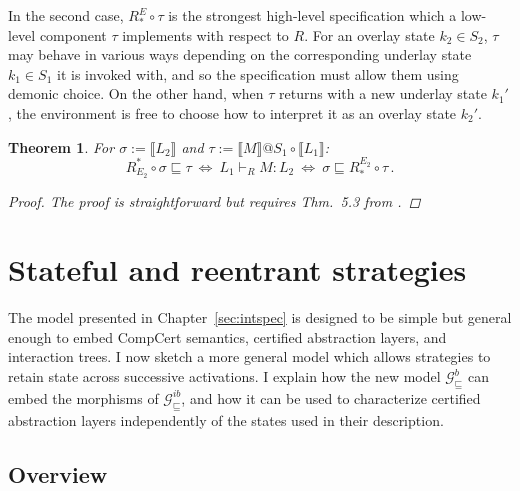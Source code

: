 \documentclass[11pt,oneside]{book}
\newtheorem{theorem}{Theorem}[chapter]
\newtheorem{lemma}[theorem]{Lemma}
\theoremstyle{definition}
\newcommand{\gcat}{\mathcal{G}_{\sqsubseteq}}
\begin{document}
In the second case,
$R_*^E \circ \tau$ is %
the strongest high-level specification
which a low-level component $\tau$ implements
with respect to $R$.
For an overlay state $k_2 \in S_2$,
$\tau$ may behave in various ways
depending on the corresponding underlay state $k_1 \in S_1$
it is invoked with,
and so the specification must allow them using demonic choice.
On the other hand,
when $\tau$ returns with a new underlay state $k_1'$,
the environment is free to choose
how to interpret it as an overlay state $k_2'$.


\begin{theorem}
For
$\sigma := \llbracket L_2 \rrbracket$ and
$\tau := \llbracket M \rrbracket @ S_1 \circ \llbracket L_1 \rrbracket$:
\[
  R^*_{E_2} \!\circ \sigma \sqsubseteq \tau
  \: \Leftrightarrow \:
  L_1 \vdash_R M : L_2
  \: \Leftrightarrow \:
  \sigma \sqsubseteq R_*^{E_2} \!\circ \tau \,.
\]
\begin{proof}
The proof is straightforward but requires
Thm.~5.3 from \citet{dndf}.
\end{proof}
\end{theorem}




\chapter{Stateful and reentrant strategies} \label{sec:gamesem} %

The model presented in Chapter~\ref{sec:intspec}
is designed to be simple but
general enough to embed CompCert semantics, certified
abstraction layers, and interaction trees.
I now sketch a more general model
which allows strategies to retain state
across successive activations.
I explain how the new model $\gcat^b$ can embed
the morphisms of $\gcat^{ib}$,
and how it can be used to characterize
certified abstraction layers
independently of the states used in their description.

\section{Overview} %
\label{sec:arrow}
\end{document}
